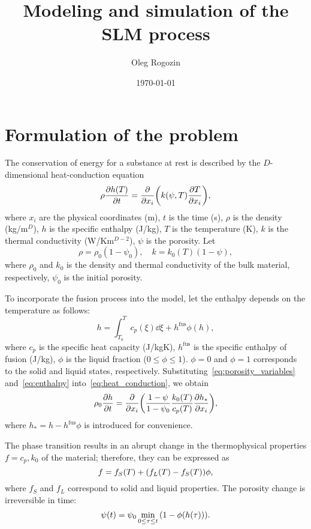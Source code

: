 \documentclass{article}
\title{Modeling and simulation of the SLM process}
\date{\today}
\author{Oleg Rogozin}
\newcommand{\fusion}[1]{{#1}^\mathrm{fus}}
\begin{document}
\maketitle
\tableofcontents

\section{Formulation of the problem}

The conservation of energy for a substance at rest is described by the \(D\)-dimensional heat-conduction equation
\begin{equation}\label{eq:heat_conduction}
	\rho\pdv{h(T)}{t} = \pdv{x_i}\qty( k(\psi,T)\pdv{T}{x_i} ),
\end{equation}
where \(x_i\) are the physical coordinates (\si{m}), \(t\) is the time (\si{s}),
\(\rho\) is the density (\si{kg/m}\(^D\)), \(h\) is the specific enthalpy (\si{J/kg}),
\(T\) is the temperature (\si{\K}), \(k\) is the thermal conductivity (\si{W/Km}\(^{D-2}\)),
\(\psi\) is the porosity. Let
\begin{equation}\label{eq:porosity_variables}
	\rho = \rho_0(1-\psi_0), \quad k = k_0(T)(1-\psi),
\end{equation}
where \(\rho_0\) and \(k_0\) is the density and thermal conductivity of the bulk material, respectively,
\(\psi_0\) is the initial porosity.

To incorporate the fusion process into the model, let the enthalpy depends on the temperature as follows:
\begin{equation}\label{eq:enthalpy}
	h = \int_{T_0}^T c_p(\xi)\dd{\xi} + \fusion{h}\phi(h),
\end{equation}
where \(c_p\) is the specific heat capacity (\si{J/kgK}), \(\fusion{h}\) is the specific enthalpy of fusion (\si{J/kg}),
\(\phi\) is the liquid fraction (\(0 \leq \phi \leq 1\)).
\(\phi=0\) and \(\phi=1\) corresponds to the solid and liquid states, respectively.
Substituting~\eqref{eq:porosity_variables} and~\eqref{eq:enthalpy} into~\eqref{eq:heat_conduction}, we obtain
\begin{equation}\label{eq:heat_conduction2}
	\rho_0\pdv{h}{t} = \pdv{x_i}\qty( \frac{1-\psi}{1-\psi_0} \frac{k_0(T)}{c_p(T)}\pdv{h_*}{x_i} ),
\end{equation}
where \(h_* = h - \fusion{h}\phi\) is introduced for convenience.

The phase transition results in an abrupt change in the thermophysical properties \(f=c_p,k_0\) of the material;
therefore, they can be expressed as
\begin{equation}\label{eq:fusion_change}
	f = f_S(T) + \qty( f_L(T) - f_S(T) )\phi,
\end{equation}
where \(f_S\) and \(f_L\) correspond to solid and liquid properties.
The porosity change is irreversible in time:
\begin{equation}\label{eq:porosity}
	\psi(t) = \psi_0\min_{0\leq\tau\leq t}\qty( 1-\phi(h(\tau)) ).
\end{equation}
\end{document}
